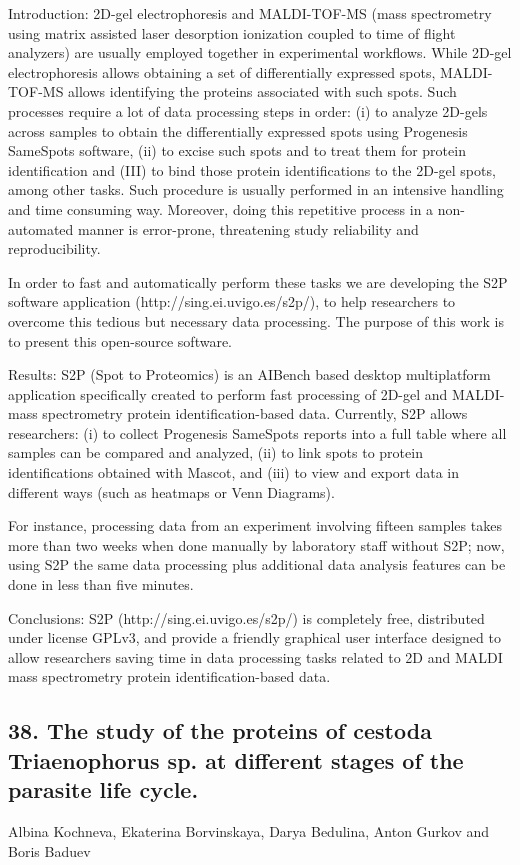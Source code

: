 Introduction: 2D-gel electrophoresis and MALDI-TOF-MS (mass spectrometry using matrix assisted laser desorption ionization coupled to time of flight analyzers) are usually employed together in experimental workflows. While 2D-gel electrophoresis allows obtaining a set of differentially expressed spots, MALDI-TOF-MS allows identifying the proteins associated with such spots. Such processes require a lot of data processing steps in order: (i) to analyze 2D-gels across samples to obtain the differentially expressed spots using Progenesis SameSpots software, (ii) to excise such spots and to treat them for protein identification and (III) to bind those protein identifications to the 2D-gel spots, among other tasks. Such procedure is usually performed in an intensive handling and time consuming way. Moreover, doing this repetitive process in a non-automated manner is error-prone, threatening study reliability and reproducibility.

In order to fast and automatically perform these tasks we are developing the S2P software application (http://sing.ei.uvigo.es/s2p/), to help researchers to overcome this tedious but necessary data processing. The purpose of this work is to present this open-source software.


Results: S2P (Spot to Proteomics) is an AIBench based desktop multiplatform application specifically created to perform fast processing of 2D-gel and MALDI-mass spectrometry protein identification-based data. Currently, S2P allows researchers: (i) to collect Progenesis SameSpots reports into a full table where all samples can be compared and analyzed, (ii) to link spots to protein identifications obtained with Mascot, and (iii) to view and export data in different ways (such as heatmaps or Venn Diagrams).

For instance, processing data from an experiment involving fifteen samples takes more than two weeks when done manually by laboratory staff without S2P; now, using S2P the same data processing plus additional data analysis features can be done in less than five minutes.


Conclusions: S2P (http://sing.ei.uvigo.es/s2p/) is completely free, distributed under license GPLv3, and provide a friendly graphical user interface designed to allow researchers saving time in data processing tasks related to 2D and MALDI mass spectrometry protein identification-based data.

\subsection*{\color{eubicRed} 38. The study of the proteins of cestoda Triaenophorus sp. at different stages of the parasite life cycle.}
{\color{eubicGray}Albina Kochneva, Ekaterina Borvinskaya, Darya Bedulina, Anton Gurkov and Boris Baduev}

